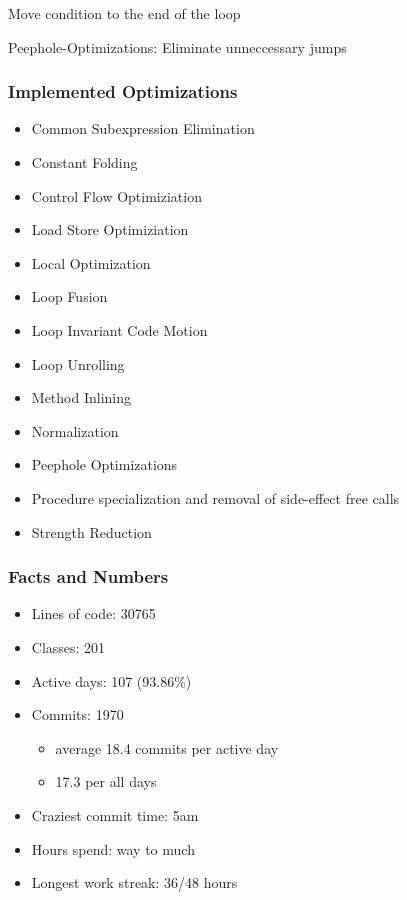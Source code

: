 \documentclass[t]{beamer}
\begin{document}
\begin{frame}
\begin{itemize}
 {\item Move condition to the end of the loop}
 {\item Peephole-Optimizations: Eliminate unneccessary jumps}
\end{itemize}
\end{frame}

\begin{frame}
  \frametitle{Implemented Optimizations}
\begin{itemize}
\item Common Subexpression Elimination
\item Constant Folding
\item Control Flow Optimiziation
\item Load Store Optimiziation
\item Local Optimization
\item Loop Fusion
\item Loop Invariant Code Motion
\item Loop Unrolling
\item Method Inlining
\item Normalization
\item Peephole Optimizations
\item Procedure specialization and removal of side-effect free calls
\item Strength Reduction
\end{itemize}
\end{frame}

\begin{frame}
  \frametitle{Facts and Numbers}
\begin{itemize}
\item Lines of code: 30765
\item Classes: 201
\item Active days: 107 (93.86\%)
\item Commits: 1970
\begin{itemize}
	\item average 18.4 commits per active day
	\item 17.3 per all days
\end{itemize}
\item Craziest commit time: 5am
\item Hours spend: way to much
\item Longest work streak: 36/48 hours
\end{itemize}
\end{frame}
\end{document}
